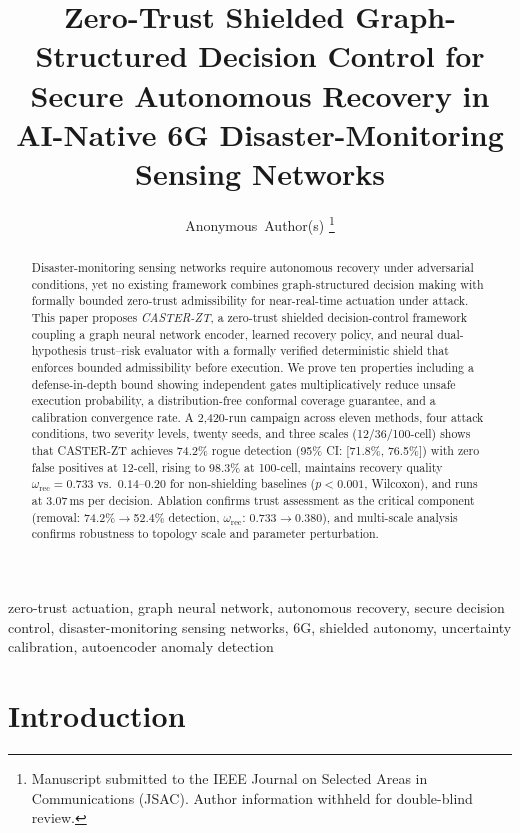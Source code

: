 \documentclass[10pt,journal,compsoc]{IEEEtran}
\title{Zero-Trust Shielded Graph-Structured Decision Control for Secure Autonomous Recovery in AI-Native 6G Disaster-Monitoring Sensing Networks}
\author{Anonymous~Author(s)%
\thanks{Manuscript submitted to the IEEE Journal on Selected Areas in Communications (JSAC). Author information withheld for double-blind review.}
}
\begin{document}
\maketitle

\begin{abstract}
Disaster-monitoring sensing networks require autonomous recovery under adversarial conditions, yet no existing framework combines graph-structured decision making with formally bounded zero-trust admissibility for near-real-time actuation under attack.
This paper proposes \emph{CASTER-ZT}, a zero-trust shielded decision-control framework coupling a graph neural network encoder, learned recovery policy, and neural dual-hypothesis trust--risk evaluator with a formally verified deterministic shield that enforces bounded admissibility before execution.
We prove ten properties including a defense-in-depth bound showing independent gates multiplicatively reduce unsafe execution probability, a distribution-free conformal coverage guarantee, and a calibration convergence rate.
A 2,420-run campaign across eleven methods, four attack conditions, two severity levels, twenty seeds, and three scales (12/36/100-cell) shows that CASTER-ZT achieves 74.2\% rogue detection (95\% CI: [71.8\%, 76.5\%]) with zero false positives at 12-cell, rising to 98.3\% at 100-cell, maintains recovery quality $\omega_{\mathrm{rec}} = 0.733$ vs.\ $0.14$--$0.20$ for non-shielding baselines ($p<0.001$, Wilcoxon), and runs at 3.07\,ms per decision.
Ablation confirms trust assessment as the critical component (removal: 74.2\%$\to$52.4\% detection, $\omega_{\mathrm{rec}}$: 0.733$\to$0.380), and multi-scale analysis confirms robustness to topology scale and parameter perturbation.
\end{abstract}

\begin{IEEEkeywords}
zero-trust actuation, graph neural network, autonomous recovery, secure decision control, disaster-monitoring sensing networks, 6G, shielded autonomy, uncertainty calibration, autoencoder anomaly detection
\end{IEEEkeywords}

\section{Introduction}
\end{document}
